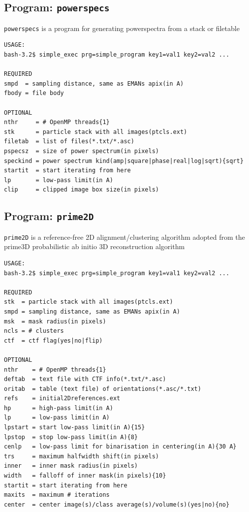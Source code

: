 \documentclass[a4paper,11pt]{article}
\newcommand{\prgname}[1]{\textcolor{NavyBlue}{\texttt{#1}}}
\begin{document}
\subsection{Program: \prgname{powerspecs}}
\label{powerspecs}
\prgname{powerspecs} is a program for generating powerspectra from a stack or filetable

\begin{verbatim}
USAGE:
bash-3.2$ simple_exec prg=simple_program key1=val1 key2=val2 ...

REQUIRED
smpd  = sampling distance, same as EMANs apix(in A)
fbody = file body

OPTIONAL
nthr     = # OpenMP threads{1}
stk      = particle stack with all images(ptcls.ext)
filetab  = list of files(*.txt/*.asc)
pspecsz  = size of power spectrum(in pixels)
speckind = power spectrum kind(amp|square|phase|real|log|sqrt){sqrt}
startit  = start iterating from here
lp       = low-pass limit(in A)
clip     = clipped image box size(in pixels)
\end{verbatim}

\subsection{Program: \prgname{prime2D}}
\label{prime2D}
\prgname{prime2D} is a reference-free 2D alignment/clustering algorithm adopted from the prime3D probabilistic ab initio 3D reconstruction algorithm

\begin{verbatim}
USAGE:
bash-3.2$ simple_exec prg=simple_program key1=val1 key2=val2 ...

REQUIRED
stk  = particle stack with all images(ptcls.ext)
smpd = sampling distance, same as EMANs apix(in A)
msk  = mask radius(in pixels)
ncls = # clusters
ctf  = ctf flag(yes|no|flip)

OPTIONAL
nthr    = # OpenMP threads{1}
deftab  = text file with CTF info(*.txt/*.asc)
oritab  = table (text file) of orientations(*.asc/*.txt)
refs    = initial2Dreferences.ext
hp      = high-pass limit(in A)
lp      = low-pass limit(in A)
lpstart = start low-pass limit(in A){15}
lpstop  = stop low-pass limit(in A){8}
cenlp   = low-pass limit for binarisation in centering(in A){30 A}
trs     = maximum halfwidth shift(in pixels)
inner   = inner mask radius(in pixels)
width   = falloff of inner mask(in pixels){10}
startit = start iterating from here
maxits  = maximum # iterations
center  = center image(s)/class average(s)/volume(s)(yes|no){no}
\end{verbatim}
\end{document}
